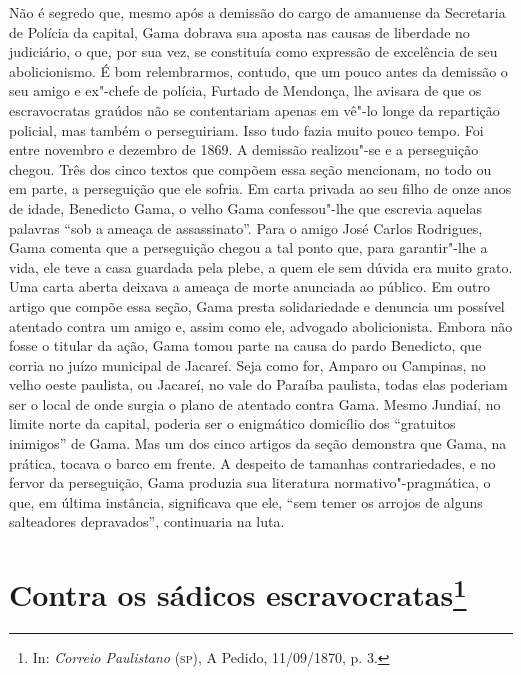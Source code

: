{\footnotesize\noindent
Não é segredo que, mesmo após a demissão do cargo de amanuense da
Secretaria de Polícia da capital, Gama dobrava sua aposta nas causas de
liberdade no judiciário, o que, por sua vez, se constituía como
expressão de excelência de seu abolicionismo. É bom relembrarmos,
contudo, que um pouco antes da demissão o seu amigo e ex"-chefe de
polícia, Furtado de Mendonça, lhe avisara de que os escravocratas
graúdos não se contentariam apenas em vê"-lo longe da repartição
policial, mas também o perseguiriam. Isso tudo fazia muito pouco tempo.
Foi entre novembro e dezembro de 1869. A demissão realizou"-se
e a perseguição chegou. Três dos cinco textos que compõem
essa seção mencionam, no todo ou em parte, a perseguição que ele sofria.
Em carta privada ao seu filho de onze anos de idade, Benedicto Gama, o
velho Gama confessou"-lhe que escrevia aquelas palavras
``sob a ameaça de assassinato''. Para o amigo José Carlos
Rodrigues, Gama comenta que a perseguição chegou a tal ponto que, para
garantir"-lhe a vida, ele teve a casa guardada pela
plebe, a quem ele sem dúvida era muito
grato. Uma carta aberta deixava a ameaça de morte anunciada ao
público. Em outro artigo que compõe essa seção, Gama
presta solidariedade e denuncia um possível atentado contra
um amigo e, assim como ele, advogado abolicionista. Embora não fosse o
titular da ação, Gama tomou parte na causa do pardo Benedicto, que
corria no juízo municipal de Jacareí. Seja como for,
Amparo ou Campinas, no velho oeste paulista, ou Jacareí, no vale do
Paraíba paulista, todas elas poderiam ser o local de onde surgia o plano
de atentado contra Gama. Mesmo Jundiaí, no limite norte da capital,
poderia ser o enigmático domicílio dos ``gratuitos inimigos'' de Gama.
Mas um dos cinco artigos da seção demonstra que Gama,
na prática, tocava o barco em frente. A
despeito de tamanhas contrariedades, e no fervor da perseguição, Gama
produzia sua literatura normativo"-pragmática, o que, em última
instância, significava que ele, ``sem temer os arrojos de alguns
salteadores depravados'', continuaria na luta. }

\@openrighttrue\makeatother \endgroup


\chapter{Contra os sádicos escravocratas\footnote[*]{In: \emph{Correio Paulistano} (\textsc{sp}), A Pedido, 11/09/1870, p. 3.}} %

